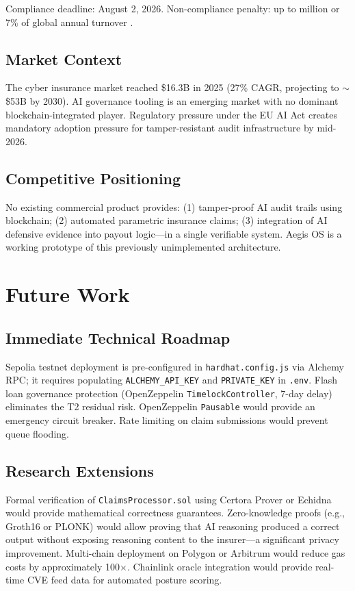 \documentclass[12pt,a4paper]{article}
\begin{document}
Compliance deadline: August 2, 2026. Non-compliance penalty: up to
 million or 7\% of global annual turnover \cite{euaiact2024}.

\subsection{Market Context}
The cyber insurance market reached \$16.3B in 2025 (27\% CAGR,
projecting to $\sim$\$53B by 2030). AI governance tooling is an
emerging market with no dominant blockchain-integrated player.
Regulatory pressure under the EU AI Act creates mandatory adoption
pressure for tamper-resistant audit infrastructure by mid-2026.

\subsection{Competitive Positioning}
No existing commercial product provides: (1) tamper-proof AI audit
trails using blockchain; (2) automated parametric insurance claims;
(3) integration of AI defensive evidence into payout logic---in a
single verifiable system. Aegis OS is a working prototype of this
previously unimplemented architecture.

\section{Future Work}
\label{sec:future}

\subsection{Immediate Technical Roadmap}
Sepolia testnet deployment is pre-configured in \texttt{hardhat.config.js}
via Alchemy RPC; it requires populating \texttt{ALCHEMY\_API\_KEY} and
\texttt{PRIVATE\_KEY} in \texttt{.env}. Flash loan governance protection
(OpenZeppelin \texttt{TimelockController}, 7-day delay) eliminates
the T2 residual risk. OpenZeppelin \texttt{Pausable} would provide an
emergency circuit breaker. Rate limiting on claim submissions would
prevent queue flooding.

\subsection{Research Extensions}
Formal verification of \texttt{ClaimsProcessor.sol} using Certora
Prover or Echidna would provide mathematical correctness guarantees.
Zero-knowledge proofs (e.g., Groth16 or PLONK) would allow proving
that AI reasoning produced a correct output without exposing reasoning
content to the insurer---a significant privacy improvement.
Multi-chain deployment on Polygon or Arbitrum would reduce gas costs
by approximately 100$\times$. Chainlink oracle integration would
provide real-time CVE feed data for automated posture scoring.
\end{document}
